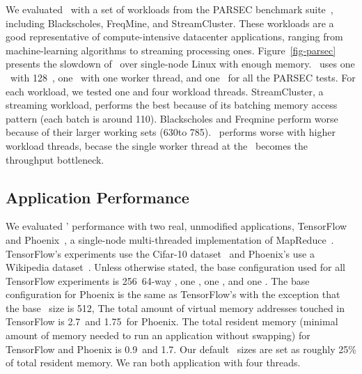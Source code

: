 \documentclass[10pt,times,twocolumn]{z2-article}
\begin{document}
{{{{{{{
We evaluated \lego\ with a set of workloads from the PARSEC benchmark suite~\cite{PARSEC},
including Blackscholes, FreqMine, and StreamCluster.
These workloads are a good representative of compute-intensive datacenter applications, 
ranging from machine-learning algorithms to streaming processing ones.
Figure~\ref{fig-parsec} presents the slowdown of \lego\ 
over single-node Linux with enough memory.
\lego\ uses one \pcomponent\ with 128\MB\ \excache,
one \mcomponent\ with one worker thread, and one \scomponent\ for all the PARSEC tests.
For each workload, we tested one and four workload threads.
StreamCluster, a streaming workload, performs the best because of its 
batching memory access pattern (each batch is around 110\MB).
Blackscholes and Freqmine perform worse because of their larger working sets (630\MB to 785\MB).
\lego\ performs worse with higher workload threads, 
becase the single worker thread at the \mcomponent\ becomes the throughput bottleneck.

\subsection{Application Performance}
\label{sec:appresults}
We evaluated \lego' performance with two real, unmodified applications, 
TensorFlow~\cite{TensorFlow} and Phoenix~\cite{Ranger07-HPCA}, a single-node multi-threaded implementation of MapReduce~\cite{DeanEtAl04-MapReduce}.
TensorFlow's experiments use the Cifar-10 dataset~\cite{CIFAR-DS} and Phoenix's use a Wikipedia dataset~\cite{Wiki-DS}.
Unless otherwise stated, the base configuration used for all TensorFlow experiments
is 256\MB\ 64-way \excache, one \pcomponent, one \mcomponent, and one \scomponent.
The base configuration for Phoenix is the same as TensorFlow's with the exception that the base \excache\ size is 512\MB,
The total amount of virtual memory addresses touched in TensorFlow is 2.7\GB\ and 1.75\GB\ for Phoenix.
The total resident memory (minimal amount of memory needed to run an application without swapping) 
for TensorFlow and Phoenix is 0.9\GB\ and 1.7\GB.
Our default \excache\ sizes are set as roughly 25\% of total resident memory.
We ran both application with four threads.

}}}}}}}
\end{document}
